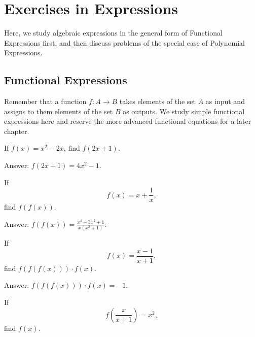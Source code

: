 \section{Exercises in Expressions}
Here, we study algebraic expressions in the general form of Functional Expressions first, and then discuss problems of the special case of Polynomial Expressions.

\subsection{Functional Expressions}
Remember that a function $f:A\to B$ takes elements of the set $A$ as input and assigns to them elements of the set $B$ as outputs. We study simple functional expressions here and reserve the more advanced functional equations for a later chapter.

\begin{tcolorbox}
\begin{question}
If $f(x)=x^2-2x$, find $f(2x+1)$.
\end{question}
\end{tcolorbox}

\begin{solution}[name=Solution by Parviz Shahriari]
Answer: $f(2x+1)=4x^2-1$.
\end{solution}

\begin{tcolorbox}
\begin{question}
If \[f(x)=x+\frac{1}{x},\] find $f(f(x))$.
\end{question}
\end{tcolorbox}

\begin{solution}[name=Solution by Parviz Shahriari]
Answer: $f(f(x))= \frac{x^4+3x^2+1}{x(x^2+1)}$.
\end{solution}

\begin{tcolorbox}
\begin{question}
If \[f(x)=\frac{x-1}{x+1},\] find $f(f(f(x)))\cdot f(x)$.
\end{question}
\end{tcolorbox}

\begin{solution}[name=Solution by Parviz Shahriari]
Answer: $f(f(f(x)))\cdot f(x) = -1$.
\end{solution}


\begin{tcolorbox}
\begin{question}
If \[f\left(\frac{x}{x+1}\right)=x^2,\] find $f(x)$.
\end{question}
\end{tcolorbox}

